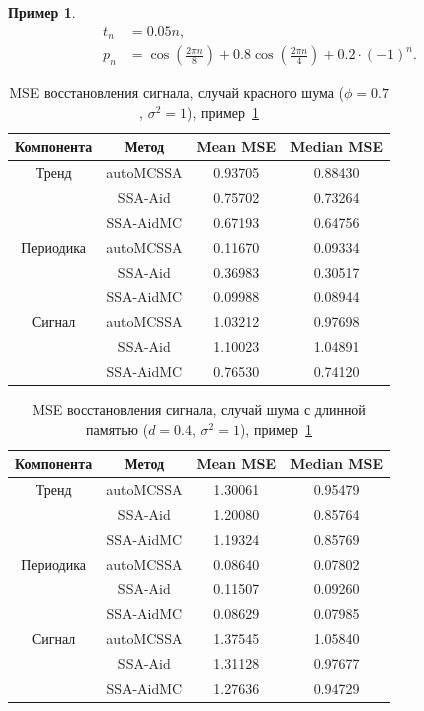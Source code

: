 \documentclass[specialist,
substylefile = spbu_report.rtx,
subf,12pt]{disser}
\theoremstyle{definition}
\newtheorem{example}{Пример}[chapter]
\begin{document}
\begin{example}\label{eg:signal3}
	\begin{align*}
		t_n & = 0.05n,\\
		p_n & = \cos\left(\frac{2 \pi n}{8}\right) + 0.8\cos\left(\frac{2 \pi n}{4}\right) + 0.2\cdot (-1)^n.
	\end{align*}

	\begin{table}[h!]
		\centering
		\caption{MSE восстановления сигнала, случай красного шума ($\phi=0.7$, $\sigma^2=1$), пример~\ref{eg:signal3}}
		\label{tab:mse_signal3_rn}
		\begin{tabular}{c|c|c|c}
			Компонента & Метод & Mean MSE & Median MSE \\
			\hline
			Тренд & autoMCSSA & 0.93705  & 0.88430 \\
			& SSA-Aid & 0.75702  & 0.73264 \\
			& SSA-AidMC & 0.67193  & 0.64756 \\
			\hline
			Периодика & autoMCSSA & 0.11670  & 0.09334 \\
			& SSA-Aid & 0.36983  & 0.30517 \\
			& SSA-AidMC & 0.09988  & 0.08944 \\
			\hline
			Сигнал & autoMCSSA & 1.03212 & 0.97698 \\
			& SSA-Aid & 1.10023  & 1.04891 \\
			& SSA-AidMC & 0.76530  & 0.74120 \\
		\end{tabular}
	\end{table}

	\begin{table}[h!]
		\centering
		\caption{MSE восстановления сигнала, случай шума с длинной памятью ($d=0.4$, $\sigma^2=1$), пример~\ref{eg:signal3}}
		\label{tab:mse_signal3_fi}
		\begin{tabular}{c|c|c|c}
			Компонента & Метод & Mean MSE & Median MSE \\
			\hline
			Тренд & autoMCSSA & 1.30061  & 0.95479 \\
			& SSA-Aid & 1.20080  & 0.85764 \\
			& SSA-AidMC & 1.19324  & 0.85769 \\
			\hline
			Периодика & autoMCSSA & 0.08640  & 0.07802 \\
			& SSA-Aid & 0.11507  & 0.09260 \\
			& SSA-AidMC & 0.08629  & 0.07985 \\
			\hline
			Сигнал & autoMCSSA & 1.37545  & 1.05840 \\
			& SSA-Aid & 1.31128  & 0.97677 \\
			& SSA-AidMC & 1.27636  & 0.94729 \\
		\end{tabular}
	\end{table}
\end{example}
\end{document}
